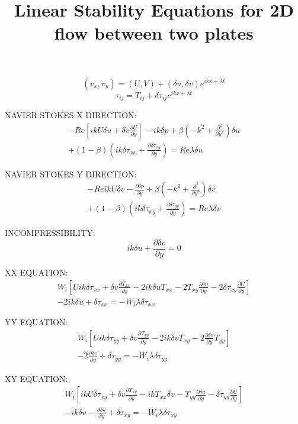 \documentclass[12,a4paper]{article}
\newcommand{\su}{\delta u}
\newcommand{\sv}{\delta v}
\newcommand{\spr}{\delta p}
\newcommand{\stxx}{\delta \tau_{xx}}
\newcommand{\styy}{\delta \tau_{yy}}
\newcommand{\stxy}{\delta \tau_{xy}}
\newcommand{\dy}[1]{\frac{\partial #1}{\partial y}}
\newcommand{\laplacian}{\left(-k^{2} + \frac{\partial^{2}}{\partial y^{2}} \right)}
\begin{document}
\title{Linear Stability Equations for 2D flow between two plates}
\maketitle

\begin{equation}
 (v_{x}, v_{y}) = (U,V) + (\su, \sv)e^{ikx + \lambda t}
\end{equation}
\begin{equation}
\tau_{ij} = T_{ij} + \delta \tau_{ij} e^{ikx + \lambda t}
\end{equation}

NAVIER STOKES X DIRECTION:
\begin{multline}
  -Re \left[ ikU\su + \sv \dy{U} \right] - ik\spr + \beta\laplacian\su \\
  + (1 - \beta)\left( ik\stxx + \dy{\stxy}\right) = Re \lambda \su
\end{multline}

NAVIER STOKES Y DIRECTION:
\begin{multline}
  -Re ikU\sv - \dy{\spr} + \beta\laplacian\sv \\
  + (1 - \beta)\left( ik\stxy + \dy{\styy}\right) = Re \lambda \sv
\end{multline}

INCOMPRESSIBILITY:
\begin{equation}
ik\su +\dy{\sv} = 0 
\end{equation}

XX EQUATION:
\begin{multline}
	W_{i} \left[ Uik\stxx + \sv\dy{T_{xx}} - 2ik\su T_{xx} - 2T_{xy}\dy{\su}  - 2\stxy \dy{U}
 \right]\\
-2ik\su +\stxx = -W_{i} \lambda \stxx
\end{multline}

YY EQUATION:
\begin{multline}
  W_{i} \left[Uik\styy + \sv \dy{T_{yy}} - 2ik\sv T_{xy} - 2\dy{\sv} T_{yy} \right]\\
  - 2 \dy{\sv} +\styy = -W_{i}\lambda\styy 
\end{multline}

XY EQUATION:
\begin{multline}
	W_{i}  \left[ ikU\stxy + \sv\dy{T_{xy}} -ikT_{xx}\sv -T_{yy}\dy{\su} - \styy\dy{U} \right] \\
	- ik\sv -\dy{\su} + \stxy = -W_{i}\lambda \stxy 
\end{multline}
\end{document}
